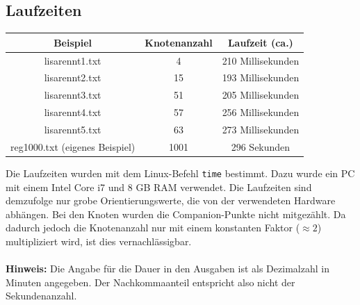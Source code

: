 \documentclass[a4paper, notitlepage, 12pt]{scrartcl}
\begin{document}
\subsection*{Laufzeiten}
 \begin{table}[H]
	\begin{tabular}{|c|c|c|} 
		\hline
		Beispiel                                      & Knotenanzahl & Laufzeit (ca.)       \\ \hline \hline
		lisarennt1.txt                              & 4     & 210 Millisekunden    \\
		lisarennt2.txt                              & 15      & 193 Millisekunden     \\
		lisarennt3.txt                              & 51      & 205 Millisekunden     \\
		lisarennt4.txt                              & 57      & 256 Millisekunden    \\
		lisarennt5.txt                              & 63      & 273 Millisekunden    \\
		reg1000.txt (eigenes Beispiel)				& 1001    & 296 Sekunden \\ \hline
	\end{tabular}
\end{table}
Die Laufzeiten wurden mit dem Linux-Befehl \texttt{time} bestimmt. Dazu wurde ein PC mit einem Intel Core i7 und 8 GB RAM verwendet. Die Laufzeiten sind demzufolge nur grobe Orientierungswerte, die von der verwendeten Hardware abhängen. Bei den Knoten wurden die Companion-Punkte nicht mitgezählt. Da dadurch jedoch die Knotenanzahl nur mit einem konstanten Faktor ($\approx 2$) multipliziert wird, ist dies vernachlässigbar. \\ \\
\textbf{Hinweis:} Die Angabe für die Dauer in den Ausgaben ist als Dezimalzahl in Minuten angegeben. Der Nachkommaanteil entspricht also nicht der Sekundenanzahl.
\end{document}
